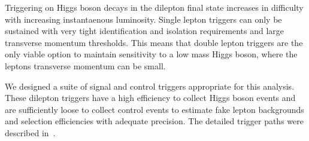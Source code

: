 Triggering on Higgs boson decays in the dilepton final state increases 
in difficulty with increasing instantaenous luminosity.
Single lepton triggers can only be sustained with very tight identification and
isolation requirements and large transverse momentum thresholds.
This means that double lepton triggers are the only viable option to maintain
sensitivity to a low mass Higgs boson, where the leptons transverse momentum
can be small.

We designed a suite of signal and control triggers appropriate for this analysis.
These dilepton triggers have a high efficiency to collect Higgs boson events
and are sufficiently loose to collect control events to estimate
fake lepton backgrounds and selection efficiencies with adequate precision. The detailed 
trigger paths were described in~\cite{HWW2011}.

